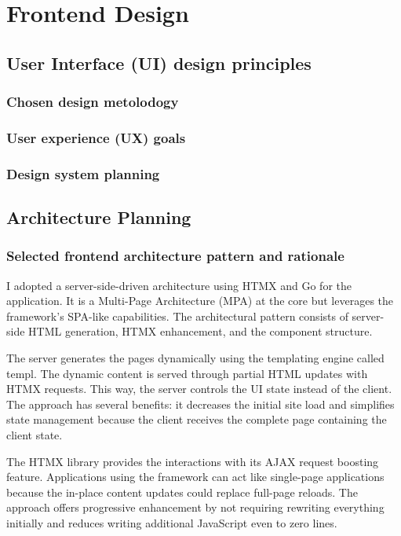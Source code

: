 \section{Frontend Design}

\subsection{User Interface (UI) design principles}

\subsubsection{Chosen design metolodogy}

\subsubsection{User experience (UX) goals}

\subsubsection{Design system planning}

\subsection{Architecture Planning}

\subsubsection{Selected frontend architecture pattern and rationale}
        
I adopted a server-side-driven architecture using HTMX and Go for the application. It is a Multi-Page Architecture (MPA) at the core but leverages the framework's SPA-like capabilities. The architectural pattern consists of server-side HTML generation, HTMX enhancement, and the component structure.

The server generates the pages dynamically using the templating engine called templ. The dynamic content is served through partial HTML updates with HTMX requests. This way, the server controls the UI state instead of the client. The approach has several benefits: it decreases the initial site load and simplifies state management because the client receives the complete page containing the client state.

The HTMX library provides the interactions with its AJAX request boosting feature. Applications using the framework can act like single-page applications because the in-place content updates could replace full-page reloads. The approach offers progressive enhancement by not requiring rewriting everything initially and reduces writing additional JavaScript even to zero lines.

